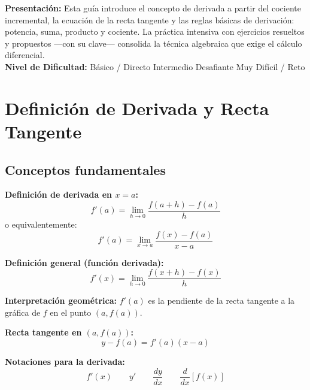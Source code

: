 \documentclass[12pt, letterpaper]{article}
\begin{document}

\vspace{4pt}
\begin{cuadroinfo}
  \small
  \textbf{Presentación:} Esta guía introduce el concepto de derivada a partir del cociente incremental, la ecuación de la recta tangente y las reglas básicas de derivación: potencia, suma, producto y cociente. La práctica intensiva con ejercicios resueltos y propuestos —con su clave— consolida la técnica algebraica que exige el cálculo diferencial.
  \\[4pt]
  \textbf{Nivel de Dificultad:}\quad
  \facil{} Básico / Directo \quad
  \medio{} Intermedio \quad
  \dificil{} Desafiante \quad
  \muyDificil{} Muy Difícil / Reto
\end{cuadroinfo}

\vspace{8pt}

\section{Definición de Derivada y Recta Tangente}

\subsection{Conceptos fundamentales}

\begin{cuadroteoria}
  \textbf{Definición de derivada en $x = a$:}
  $$f'(a) = \lim_{h \to 0} \frac{f(a + h) - f(a)}{h}$$
  o equivalentemente:
  $$f'(a) = \lim_{x \to a} \frac{f(x) - f(a)}{x - a}$$

  \textbf{Definición general (función derivada):}
  $$f'(x) = \lim_{h \to 0} \frac{f(x + h) - f(x)}{h}$$

  \textbf{Interpretación geométrica:} $f'(a)$ es la pendiente de la recta tangente a la gráfica de $f$ en el punto $(a, f(a))$.
\end{cuadroteoria}

\newpage

\begin{cuadrosolucion}
  \textbf{Recta tangente en $(a, f(a))$:}
  $$y - f(a) = f'(a)(x - a)$$

  \textbf{Notaciones para la derivada:}
  $$f'(x) \qquad y' \qquad \frac{dy}{dx} \qquad \frac{d}{dx}[f(x)]$$
\end{cuadrosolucion}
\end{document}
